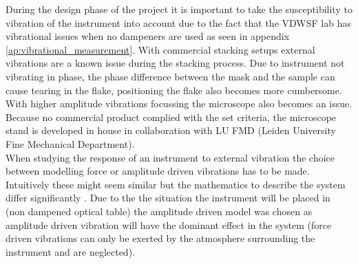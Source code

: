 \documentclass[10pt]{article}
\begin{document}
During the design phase of the project it is important to take the susceptibility to vibration of the instrument into account due to the fact that the VDWSF lab has vibrational issues when no dampeners are used as seen in appendix \ref{ap:vibrational_measurement}.
With commercial stacking setups external vibrations are a known issue during the stacking process. 
Due to instrument not vibrating in phase, the phase difference between the mask and the sample can cause tearing in the flake, positioning the flake also becomes more cumbersome.
With higher amplitude vibrations focussing the microscope also becomes an issue.
Because no commercial product complied with the set criteria, the microscope stand is developed in house in collaboration with LU FMD (Leiden University Fine Mechanical Department).\\

When studying the response of an instrument to external vibration the choice between modelling force or amplitude driven vibrations has to be made.
Intuitively these might seem similar but the mathematics to describe the system differ significantly \cite{hesselberthMicroscopieBeweging}.
Due to the the situation the instrument will be placed in (non dampened optical table) the amplitude driven model was chosen as amplitude driven vibration will have the dominant effect in the system (force driven vibrations can only be exerted by the atmosphere surrounding the instrument and are neglected).
\end{document}
